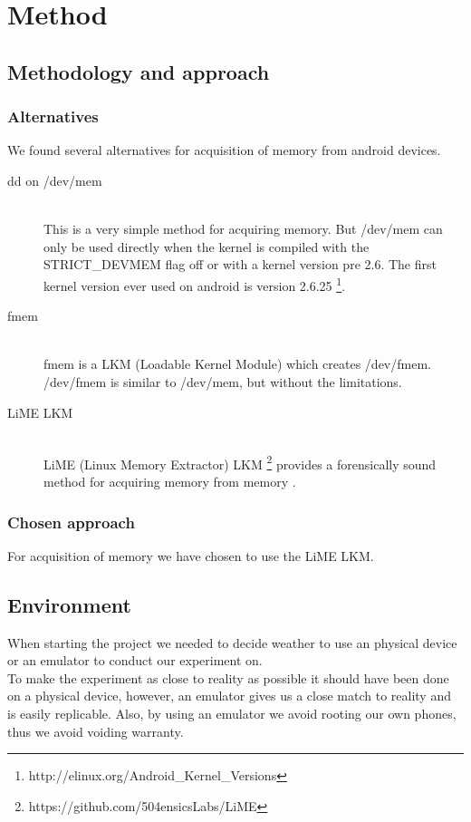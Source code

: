 \section{Method}
\subsection{Methodology and approach}
  \subsubsection{Alternatives}
  We found several alternatives for acquisition of memory from android devices.
  \begin{description}
    \item[dd on /dev/mem] \hfill \\
      This is a very simple method for acquiring memory. But /dev/mem can only be used directly when the kernel is 
      compiled with the STRICT\_DEVMEM flag off or with a kernel version pre 2.6. The first kernel version ever used on 
      android is version 2.6.25 \footnote{http://elinux.org/Android\_Kernel\_Versions}.
    \item[fmem] \hfill \\
      fmem is a LKM (Loadable Kernel Module) which creates /dev/fmem. /dev/fmem is similar to /dev/mem, but without the limitations.
    \item[LiME LKM] \hfill \\
      LiME (Linux Memory Extractor) LKM \footnote{https://github.com/504ensicsLabs/LiME} provides a forensically sound method for acquiring memory from 
      memory \cite{heriyanto2013procedures}.
  \end{description}
  \subsubsection{Chosen approach}
  For acquisition of memory we have chosen to use the LiME LKM.
\subsection{Environment}
When starting the project we needed to decide weather to use an physical device or an emulator
to conduct our experiment on.\\
To make the experiment as close to reality as possible it should have been done on a physical device, 
however, an emulator gives us a close match to reality and is easily replicable. Also, by using an emulator 
we avoid rooting our own phones, thus we avoid voiding warranty.


